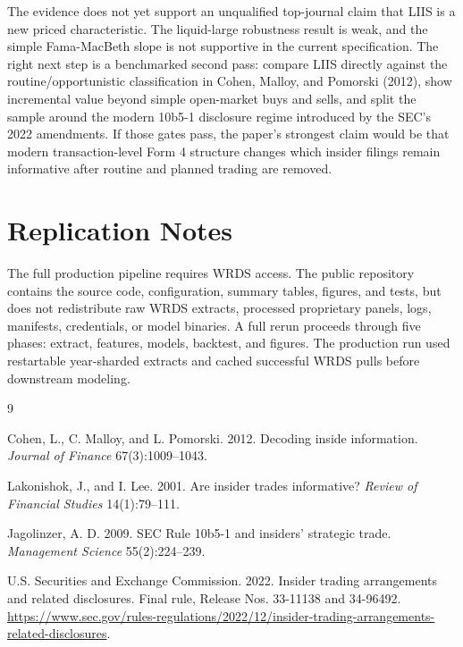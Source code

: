 \documentclass[11pt]{article}
\begin{document}
The evidence does not yet support an unqualified top-journal claim that LIIS is
a new priced characteristic. The liquid-large robustness result is weak, and the
simple Fama-MacBeth slope is not supportive in the current specification. The
right next step is a benchmarked second pass: compare LIIS directly against the
routine/opportunistic classification in Cohen, Malloy, and Pomorski (2012), show
incremental value beyond simple open-market buys and sells, and split the sample
around the modern 10b5-1 disclosure regime introduced by the SEC's 2022
amendments. If those gates pass, the paper's strongest claim would be that
modern transaction-level Form 4 structure changes which insider filings remain
informative after routine and planned trading are removed.

\section{Replication Notes}

The full production pipeline requires WRDS access. The public repository
contains the source code, configuration, summary tables, figures, and tests, but
does not redistribute raw WRDS extracts, processed proprietary panels, logs,
manifests, credentials, or model binaries. A full rerun proceeds through five
phases: extract, features, models, backtest, and figures. The production run used
restartable year-sharded extracts and cached successful WRDS pulls before
downstream modeling.

\begin{thebibliography}{9}

Cohen, L., C. Malloy, and L. Pomorski. 2012.
\newblock Decoding inside information.
\newblock \textit{Journal of Finance} 67(3):1009--1043.

Lakonishok, J., and I. Lee. 2001.
\newblock Are insider trades informative?
\newblock \textit{Review of Financial Studies} 14(1):79--111.

Jagolinzer, A. D. 2009.
\newblock SEC Rule 10b5-1 and insiders' strategic trade.
\newblock \textit{Management Science} 55(2):224--239.

U.S. Securities and Exchange Commission. 2022.
\newblock Insider trading arrangements and related disclosures.
\newblock Final rule, Release Nos. 33-11138 and 34-96492.
\newblock \url{https://www.sec.gov/rules-regulations/2022/12/insider-trading-arrangements-related-disclosures}.

\end{thebibliography}
\end{document}
